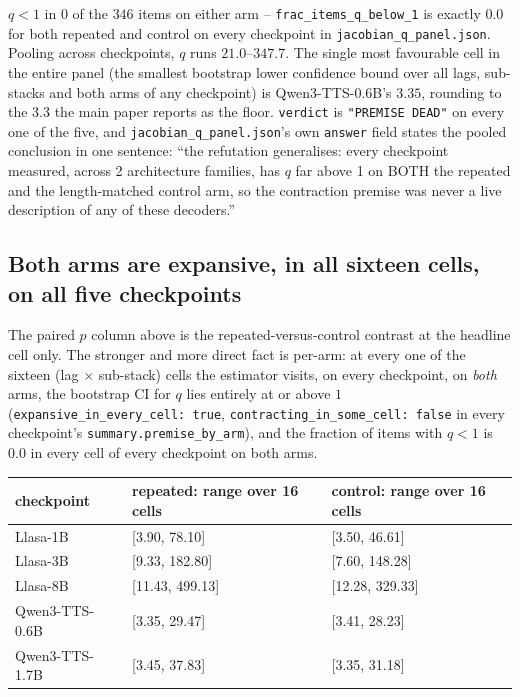 \documentclass[11pt]{article}
\begin{document}
$q<1$ in $0$ of the $346$ items on either arm -- \texttt{frac\_items\_q\_below\_1}
is exactly $0.0$ for both repeated and control on every checkpoint in
\texttt{jacobian\_q\_panel.json}. Pooling across checkpoints, $q$ runs
$21.0$--$347.7$. The single most favourable cell in the entire panel (the
smallest bootstrap lower confidence bound over all lags, sub-stacks and both
arms of any checkpoint) is Qwen3-TTS-0.6B's $3.35$, rounding to the $3.3$ the
main paper reports as the floor. \texttt{verdict} is \texttt{"PREMISE DEAD"} on
every one of the five, and \texttt{jacobian\_q\_panel.json}'s own
\texttt{answer} field states the pooled conclusion in one sentence: ``the
refutation generalises: every checkpoint measured, across 2 architecture
families, has $q$ far above 1 on BOTH the repeated and the length-matched
control arm, so the contraction premise was never a live description of any of
these decoders.''

\subsection{Both arms are expansive, in all sixteen cells, on all five checkpoints}
\label{sec:s5-jacobian-arms}

The paired $p$ column above is the repeated-versus-control contrast at the
headline cell only. The stronger and more direct fact is per-arm: at every one
of the sixteen (lag $\times$ sub-stack) cells the estimator visits, on every
checkpoint, on \emph{both} arms, the bootstrap CI for $q$ lies entirely at or
above $1$ (\texttt{expansive\_in\_every\_cell: true},
\texttt{contracting\_in\_some\_cell: false} in every checkpoint's
\texttt{summary.premise\_by\_arm}), and the fraction of items with $q<1$ is
$0.0$ in every cell of every checkpoint on both arms.

\begin{center}
\begin{tabular}{lp{3.6cm}p{3.6cm}}
\toprule
checkpoint & repeated: range over 16 cells & control: range over 16 cells \\
\midrule
Llasa-1B & [3.90, 78.10] & [3.50, 46.61] \\
Llasa-3B & [9.33, 182.80] & [7.60, 148.28] \\
Llasa-8B & [11.43, 499.13] & [12.28, 329.33] \\
Qwen3-TTS-0.6B & [3.35, 29.47] & [3.41, 28.23] \\
Qwen3-TTS-1.7B & [3.45, 37.83] & [3.35, 31.18] \\
\bottomrule
\end{tabular}
\end{center}
\end{document}
